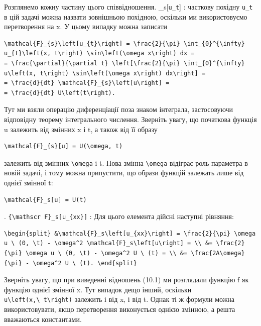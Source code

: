 \documentclass[
  ukrainian,
]{article}
\begin{document}
Розглянемо кожну частину цього співвідношення.
\_s{[}\texttt{u\_t}{]} : часткову похідну \texttt{u\_t} в цій
задачі можна назвати зовнішньою похідною, оскільки ми використовуємо
перетворення на x. У цьому випадку можна записати

\begin{verbatim}
\mathcal{F}_{s}\left[u_{t}\right] = \frac{2}{\pi} \int_{0}^{\infty} u_{t}\left(x, t\right) \sin\left(\omega x\right) dx =
= \frac{\partial}{\partial t} \left[\frac{2}{\pi} \int_{0}^{\infty} u\left(x, t\right) \sin\left(\omega x\right) dx\right] =
= \frac{d}{dt} \mathcal{F}_{s}\left[u\right] =
= \frac{d}{dt} U\left(t\right).
\end{verbatim}

Тут ми взяли операцію диференціації поза знаком інтеграла, застосовуючи
відповідну теорему інтегрального числення. Зверніть увагу, що початкова
функція u залежить від змінних x і t, а також від її образу

\begin{verbatim}
\mathcal{F}_{s}[u] = U(\omega, t)
\end{verbatim}

залежить від змінних \texttt{\textbackslash{}omega} і t. Нова змінна
\texttt{\textbackslash{}omega} відіграє роль параметра в новій задачі, і
тому можна припустити, що образи функцій залежать лише від однієї
змінної t:

\begin{verbatim}
\mathcal{F}_s[u] = U(t)
\end{verbatim}

. \texttt{\{\textbackslash{}mathscr\ F\}\_s{[}u\_\{xx\}{]}} : Для цього
елемента дійсні наступні рівняння:

\begin{verbatim}
\begin{split} &\mathcal{F}_s\left[u_{xx}\right] = \frac{2}{\pi} \omega u \ (0, \t) - \omega^2 \mathcal{F}_s\left[u\right] = \\ &= \frac{2}{\pi} \omega u \ (0, \t) - \omega^2 U \ (t) = \\ &= \frac{2A\omega}{\pi} - \omega^2 U \ (t). \end{split}
\end{verbatim}

Зверніть увагу, що при виведенні відношень (10.1) ми розглядали функцію
f як функцію однієї змінної x. Тут випадок дещо інший, оскільки
\texttt{u\textbackslash{}left(x,\textbackslash{}\ t\textbackslash{}right)}
залежить і від x, і від t. Однак ті ж формули можна використовувати,
якщо перетворення виконується однією змінною, а решта вважаються
константами.
\end{document}
